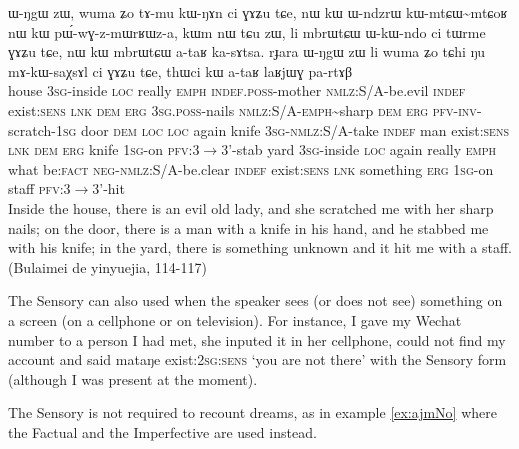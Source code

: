 \documentclass[oldfontcommands,oneside,a4paper,11pt]{article}
\newcommand{\ipa}[1]{{\phon \mbox{#1}}} %
\newcommand{\rdp}{\textasciitilde{}}
\begin{document}
\begin{exe}
\ex \label{ex:bulaimei}
\gll \ipa{kha}	\ipa{ɯ-ŋgɯ}	\ipa{zɯ,}	\ipa{wuma}	\ipa{ʑo}	\ipa{tɤ-mu}	\ipa{kɯ-ŋɤn}	\ipa{ci}	\ipa{ɣɤʑu}	\ipa{tɕe,} \ipa{nɯ}	\ipa{kɯ}	\ipa{ɯ-ndzrɯ}	\ipa{kɯ-mtɕɯ\rdp{}mtɕoʁ}	\ipa{nɯ}	\ipa{kɯ}	\ipa{pɯ́-wɣ-z-mɯrʁɯz-a,} \ipa{kɯm}	\ipa{nɯ} \ipa{tɕu}	\ipa{zɯ,}	\ipa{li}	\ipa{mbrɯtɕɯ}	\ipa{ɯ-kɯ-ndo}	\ipa{ci}	\ipa{tɯrme}	\ipa{ɣɤʑu}	\ipa{tɕe,}	\ipa{nɯ}	\ipa{kɯ}	\ipa{mbrɯtɕɯ}	\ipa{a-taʁ}	\ipa{ka-sɤtsa.}  \ipa{rɟara}	\ipa{ɯ-ŋgɯ}	\ipa{zɯ}	\ipa{li}	\ipa{wuma}	\ipa{ʑo}	\ipa{tɕhi}	\ipa{ŋu}	\ipa{mɤ-kɯ-saχsɤl}	\ipa{ci}	\ipa{ɣɤʑu}	\ipa{tɕe,}	\ipa{thɯci}	\ipa{kɯ}	\ipa{a-taʁ}	\ipa{laʁjɯɣ}	\ipa{pa-rtɤβ} \\
house \textsc{3sg}-inside \textsc{loc} really \textsc{emph} \textsc{indef.poss}-mother \textsc{nmlz}:S/A-be.evil \textsc{indef} exist:\textsc{sens} \textsc{lnk} \textsc{dem} \textsc{erg} \textsc{3sg.poss}-nails \textsc{nmlz}:S/A-\textsc{emph}\rdp{}sharp \textsc{dem} \textsc{erg} \textsc{pfv-inv}-scratch-\textsc{1sg} door \textsc{dem} \textsc{loc}  \textsc{loc} again knife \textsc{3sg-nmlz}:S/A-take \textsc{indef} man exist:\textsc{sens} \textsc{lnk} \textsc{dem} \textsc{erg} knife \textsc{1sg}-on \textsc{pfv}:3$\rightarrow$3'-stab yard \textsc{3sg}-inside \textsc{loc} again really \textsc{emph} what be:\textsc{fact} \textsc{neg-nmlz}:S/A-be.clear \textsc{indef} exist:\textsc{sens} \textsc{lnk} something \textsc{erg}  \textsc{1sg}-on staff \textsc{pfv}:3$\rightarrow$3'-hit \\
\glt Inside the house, there is an evil old lady, and she scratched me with her sharp nails; on the door, there is a man with a knife in his hand, and he stabbed me with his knife; in the yard, there is something unknown and it hit me with a staff.  (Bulaimei de yinyuejia, 114-117)
\end{exe}

The Sensory can also used when the speaker sees (or does not see) something on a screen (on a cellphone or on television). For instance, I gave my Wechat number to a person I had met, she inputed it in her cellphone, could not find my account and said \ipa{mataŋe} exist:\textsc{2sg:sens} `you are not there' with the Sensory form (although I was present at the moment).

The Sensory is not required to recount dreams, as in example \ref{ex:ajmNo} where the Factual and the Imperfective are used instead.
\end{document}

